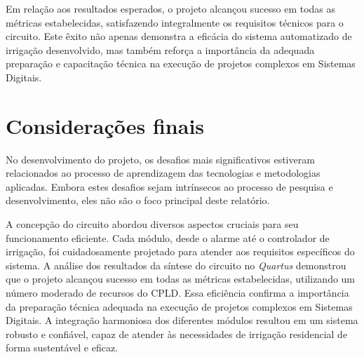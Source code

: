 \documentclass[
	article,			%
	11pt,				%
	oneside,			%
	a4paper,			%
	english,			%
	brazil,				%
	sumario=tradicional
	]{abntex2}
\begin{document}
Em relação aos resultados esperados, o projeto alcançou sucesso em todas as métricas estabelecidas, satisfazendo integralmente os requisitos técnicos para o circuito. Este êxito não apenas demonstra a eficácia do sistema automatizado de irrigação desenvolvido, mas também reforça a importância da adequada preparação e capacitação técnica na execução de projetos complexos em Sistemas Digitais.
% 

\section*{Considerações finais}

No desenvolvimento do projeto, os desafios mais significativos estiveram relacionados ao processo de aprendizagem das tecnologias e metodologias aplicadas. Embora estes desafios sejam intrínsecos ao processo de pesquisa e desenvolvimento, eles não são o foco principal deste relatório. 

A concepção do circuito abordou diversos aspectos cruciais para seu funcionamento eficiente. Cada módulo, desde o alarme até o controlador de irrigação, foi cuidadosamente projetado para atender aos requisitos específicos do sistema. A análise dos resultados da síntese do circuito no \textit{Quartus} demonstrou que o projeto alcançou sucesso em todas as métricas estabelecidas, utilizando um número moderado de recursos do CPLD. Essa eficiência confirma a importância da preparação técnica adequada na execução de projetos complexos em Sistemas Digitais. A integração harmoniosa dos diferentes módulos resultou em um sistema robusto e confiável, capaz de atender às necessidades de irrigação residencial de forma sustentável e eficaz.




\postextual


\end{document}
